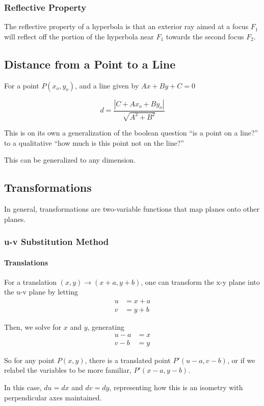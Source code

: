 \documentclass{article}
\begin{document}
\subsubsection{Reflective Property}
The reflective property of a hyperbola is that an exterior ray aimed at a focus $F_1$ will reflect off the portion of the hyperbola near $F_1$ towards the second focus $F_2$.

\subsection{Distance from a Point to a Line}
For a point $P(x_o, y_o)$, and a line given by $Ax + By + C = 0$

$$d = \frac{|C + Ax_o + By_o|}{\sqrt{A^2+B^2}}$$

This is on its own a generalization of the boolean question ``is a point on a line?'' to a qualitative ``how much is this point not on the line?''

This can be generalized to any dimension.

\subsection{Transformations}
In general, transformations are two-variable functions that map planes onto other planes.

\subsubsection{u-v Substitution Method}
\paragraph{Translations}
For a translation $(x, y) \longrightarrow (x + a, y + b)$, one can transform the x-y plane into the u-v plane by letting
\begin{align*}
    u & = x + a  \\
    v & = y + b
\end{align*}

Then, we solve for $x$ and $y$, generating
\begin{align*}
    u - a & = x  \\
    v - b & = y
\end{align*}

So for any point $P(x,y)$, there is a translated point $P'(u-a,v-b)$, or if we relabel the variables to be more familiar, $P'(x-a,y-b)$.

In this case, $du = dx$ and $dv = dy$, representing how this is an isometry with perpendicular axes maintained.
\end{document}

